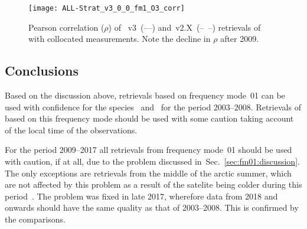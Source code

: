 \begin{figure}[ht]
    \centering
    \texttt{[image: ALL-Strat\_v3\_0\_0\_fm1\_O3\_corr]}
    \caption{Pearson correlation ($\rho$) of \smr~v3~(---) and~v2.X~(--~--)
    retrievals of  with collocated measurements. Note the decline in
    $\rho$ after 2009.}
    \label{fig:fm01:O3:corr}
\end{figure}

\subsection{Conclusions}
\label{sec:fm01:conclusions}
Based on the discussion above, retrievals based on frequency mode~01 can be
used with confidence for the species~ and~ for the
period 2003--2008. Retrievals of  based on this frequency mode
should be used with some caution taking account of the local time of the
observations.

For the period 2009--2017  all retrievals from frequency mode~01 should be used
with  caution, if at all, due to the problem discussed
in~Sec.~\ref{sec:fm01:discussion}. The only exceptions are retrievals from the
middle of the arctic summer, which are not affected by this problem as a result
of the satelite being colder during this period~\cite{postlaunch:2006}. The
problem was fixed in late 2017, wherefore data from 2018 and onwards should
have the same quality as that of 2003--2008. This is confirmed by the comparisons.